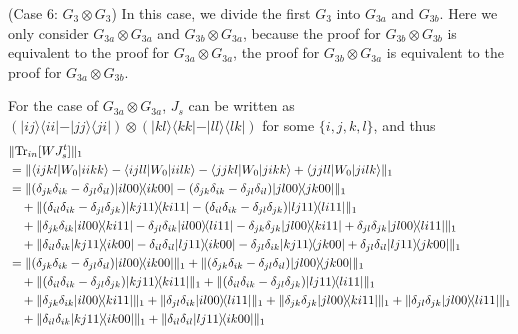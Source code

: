 \documentclass[a4paper,twocolumn,accepted=2022-10-23]{quantumarticle}
\newcommand{\bra}[1]{\langle {#1} \vert}
\newcommand{\ket}[1]{\vert {#1} \rangle}
\newcommand{\ketbra}[2]{\vert {#1} \rangle\!\langle {#2} \vert}
\newcommand{\Tr}[0]{{\mathrm{Tr}}}
\theoremstyle{definition}
\begin{document}
(Case 6: $G_3 \otimes G_3$) \quad
In this case, we divide the first $G_3$ into $G_{3a}$ and $G_{3b}$.
Here we only consider $G_{3a} \otimes G_{3a}$ and $G_{3b} \otimes G_{3a}$,
because the proof for $G_{3b} \otimes G_{3b}$ is equivalent to the proof for $G_{3a} \otimes G_{3a}$,
the proof for $G_{3b} \otimes G_{3a}$ is equivalent to the proof for $G_{3a} \otimes G_{3b}$.


For the case of $G_{3a} \otimes G_{3a}$,
$J_s$ can be written as $(\ketbra{ij}{ii} - \ketbra{jj}{ji}) \otimes (\ketbra{kl}{kk} - \ketbra{ll}{lk})$ for some $\{i,j,k,l\}$, and thus
\begin{align}
&\| \Tr_{in} [W J_s^t] \|_1 \notag \\
&= \| \bra{ijkl} {W_0} \ket{iikk} - \bra{ijll} {W_0} \ket{iilk}
 - \bra{jjkl} {W_0} \ket{jikk} + \bra{jjll} {W_0} \ket{jilk} \|_1 \\
%
&= \| (\delta_{jk}\delta_{ik} - \delta_{jl}\delta_{il} ) \ketbra{il00}{ik00}
- (\delta_{jk}\delta_{ik} - \delta_{jl}\delta_{il} ) \ketbra{jl00}{jk00} \|_1 \notag \\
&\quad + \| (\delta_{il}\delta_{ik} -\delta_{jl}\delta_{jk}) \ketbra{kj11}{ki11}
- (\delta_{il}\delta_{ik} - \delta_{jl}\delta_{jk} ) \ketbra{lj11}{li11} \|_1 \notag \\
&\quad + \| \delta_{jk}\delta_{ik} \ketbra{il00}{ki11} - \delta_{jl}\delta_{ik} \ketbra{il00}{li11}
-\delta_{jk}\delta_{jk} \ketbra{jl00}{ki11} + \delta_{jl}\delta_{jk} \ketbra{jl00}{li11} \|_1 \notag \\
&\quad + \| \delta_{il}\delta_{ik} \ketbra{kj11}{ik00} - \delta_{il}\delta_{il} \ketbra{lj11}{ik00}
-\delta_{jl}\delta_{ik} \ketbra{kj11}{jk00} + \delta_{jl}\delta_{il} \ketbra{lj11}{jk00} \|_1 \\
%
&= \| (\delta_{jk}\delta_{ik} - \delta_{jl}\delta_{il}) \ketbra{il00}{ik00} \|_1
+ \| (\delta_{jk}\delta_{ik} - \delta_{jl}\delta_{il}) \ketbra{jl00}{jk00} \|_1 \notag \\
&\quad + \| (\delta_{il}\delta_{ik} -\delta_{jl}\delta_{jk}) \ketbra{kj11}{ki11} \|_1
+ \| (\delta_{il}\delta_{ik} - \delta_{jl}\delta_{jk} ) \ketbra{lj11}{li11} \|_1 \notag \\
&\quad + \| \delta_{jk}\delta_{ik} \ketbra{il00}{ki11} \|_1 + \| \delta_{jl}\delta_{ik} \ketbra{il00}{li11} \|_1
+ \| \delta_{jk}\delta_{jk} \ketbra{jl00}{ki11} \|_1 + \| \delta_{jl}\delta_{jk} \ketbra{jl00}{li11} \|_1 \notag \\
&\quad + \| \delta_{il}\delta_{ik} \ketbra{kj11}{ik00} \|_1 + \| \delta_{il}\delta_{il} \ketbra{lj11}{ik00} \|_1

\end{align}
\end{document}
